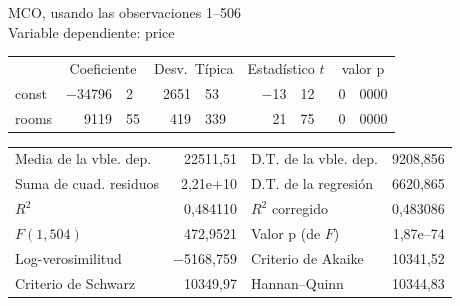 \begin{center}

MCO, usando las observaciones 1--506\\
Variable dependiente: price\\

\vspace{1em}

\begin{tabular}{lr@{,}lr@{,}lr@{,}lr@{,}l}
  &
 \multicolumn{2}{c}{Coeficiente} &
  \multicolumn{2}{c}{Desv.\ Típica} &
   \multicolumn{2}{c}{Estadístico $t$} &
    \multicolumn{2}{c}{valor p} \\[1ex]
const &
  $-$34796&2 &
    2651&53 &
      $-$13&12 &
        0&0000 \\
rooms &
  9119&55 &
    419&339 &
      21&75 &
        0&0000 \\
\end{tabular}

\vspace{1ex}
\begin{tabular}{lrlr}
Media de la vble. dep. &  22511,51 & D.T. de la vble. dep. &  9208,856 \\
Suma de cuad. residuos &  2,21\textrm{e+10} & D.T. de la regresión &  6620,865 \\
$R^2$ &  0,484110 & $R^2$ corregido &  0,483086 \\
$F(1, 504)$ &  472,9521 & Valor p (de $F$) &  1,87\textrm{e--74} \\
Log-verosimilitud & $-$5168,759 & Criterio de Akaike &  10341,52 \\
Criterio de Schwarz &  10349,97 & Hannan--Quinn &  10344,83 \\
\end{tabular}


\end{center}
